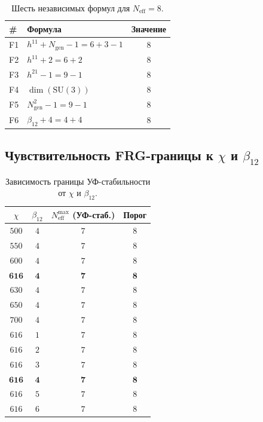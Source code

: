 \documentclass[11pt,a4paper]{article}
\newcommand{\SU}{\ensuremath{\mathrm{SU}}}
\theoremstyle{definition}
\begin{document}
\begin{table}[ht]
\centering
\caption{Шесть независимых формул для $N_{\text{eff}} = 8$.}
\label{tab:app-frg-six-formulas}
\begin{tabular}{llc}
\toprule
\# & Формула & Значение \\
\midrule
F1 & $h^{11} + N_{\text{gen}} - 1 = 6 + 3 - 1$ & $8$ \\
F2 & $h^{11} + 2 = 6 + 2$ & $8$ \\
F3 & $h^{21} - 1 = 9 - 1$ & $8$ \\
F4 & $\dim(\SU(3))$ & $8$ \\
F5 & $N_{\text{gen}}^2 - 1 = 9 - 1$ & $8$ \\
F6 & $\beta_{12} + 4 = 4 + 4$ & $8$ \\
\bottomrule
\end{tabular}
\end{table}

\subsection{Чувствительность FRG-границы к \texorpdfstring{$\chi$}{chi} и \texorpdfstring{$\beta_{12}$}{beta\_12}}
\label{app:frg-sensitivity}

\begin{table}[ht]
\centering
\caption{Зависимость границы УФ-стабильности от \texorpdfstring{$\chi$}{} и \texorpdfstring{$\beta_{12}$}{\_12}.}
\label{tab:app-frg-sensitivity}
\begin{tabular}{cccc}
\toprule
$\chi$ & $\beta_{12}$ & $N_{\text{eff}}^{\max}$ (УФ-стаб.) & Порог \\
\midrule
$500$ & $4$ & $7$ & $8$ \\
$550$ & $4$ & $7$ & $8$ \\
$600$ & $4$ & $7$ & $8$ \\
$\mathbf{616}$ & $\mathbf{4}$ & $\mathbf{7}$ & $\mathbf{8}$ \\
$630$ & $4$ & $7$ & $8$ \\
$650$ & $4$ & $7$ & $8$ \\
$700$ & $4$ & $7$ & $8$ \\
\midrule
$616$ & $1$ & $7$ & $8$ \\
$616$ & $2$ & $7$ & $8$ \\
$616$ & $3$ & $7$ & $8$ \\
$\mathbf{616}$ & $\mathbf{4}$ & $\mathbf{7}$ & $\mathbf{8}$ \\
$616$ & $5$ & $7$ & $8$ \\
$616$ & $6$ & $7$ & $8$ \\
\bottomrule
\end{tabular}
\end{table}
\end{document}
